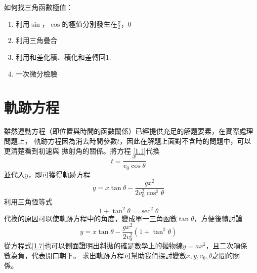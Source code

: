 \documentclass[cn,10pt,math=newtx,chinesefont=founder]{../elegantbook}
\begin{document}
\begin{note}
    如何找三角函數極值：
    \begin{enumerate}
        \item 利用$\sin$，$\cos$的極值分別發生在$\frac{\pi}{2}$，$0$
        \item 利用三角疊合
        \item 利用和差化積、積化和差轉回1.
        \item 一次微分檢驗
    \end{enumerate}
\end{note}




\section{軌跡方程}
雖然運動方程（即位置與時間的函數關係）已經提供充足的解題要素，在實際處理問題上，
軌跡方程因為消去時間參數$t$，因此在解題上面對不含時的問題中，可以更清楚看到初速與
拋射角的關係。將方程 \ref{1.1}代換
\begin{equation}
    t = \frac{x}{v_0 \cos \theta}
\end{equation}
並代入$y$，即可獲得軌跡方程
\begin{equation}
    y=x \operatorname{tan} \theta-\frac{g x^{2}}{2 v_{0}^{2}\cos^2 \theta}
\end{equation}
利用三角恆等式
\begin{equation}
    1+\tan^2 \theta = \sec^2 \theta 
\end{equation}
代換的原因可以使軌跡方程中的角度，變成單一三角函數$\tan \theta$，方便後續討論
\begin{equation} \label{1.7}
    y=x \operatorname{tan} \theta-\frac{g x^{2}}{2 v_{0}^{2}}\left(1+\operatorname{tan}^{2} \theta\right)
\end{equation}
從方程式\ref{1.7}也可以側面證明出斜拋的確是數學上的拋物線$y = ax^2$，且二次項係數為負，代表開口朝下。
求出軌跡方程可幫助我們探討變數$x,y,v_0,\theta$之間的關係。\\
\end{document}

